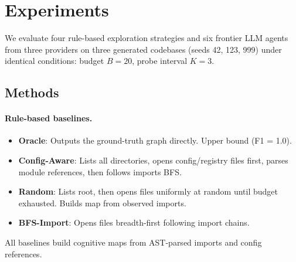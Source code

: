 \documentclass{article}
\begin{document}
\section{Experiments}
\label{sec:results}

We evaluate four rule-based exploration strategies and six frontier LLM agents from three providers on three generated codebases (seeds 42, 123, 999) under identical conditions: budget $B{=}20$, probe interval $K{=}3$.

\subsection{Methods}

\paragraph{Rule-based baselines.}
\begin{itemize}[nosep]
    \item \textbf{Oracle}: Outputs the ground-truth graph directly. Upper bound (F1 = 1.0).
    \item \textbf{Config-Aware}: Lists all directories, opens config/registry files first, parses module references, then follows imports BFS.
    \item \textbf{Random}: Lists root, then opens files uniformly at random until budget exhausted. Builds map from observed imports.
    \item \textbf{BFS-Import}: Opens files breadth-first following import chains.
\end{itemize}
All baselines build cognitive maps from AST-parsed imports and config references.
\end{document}
